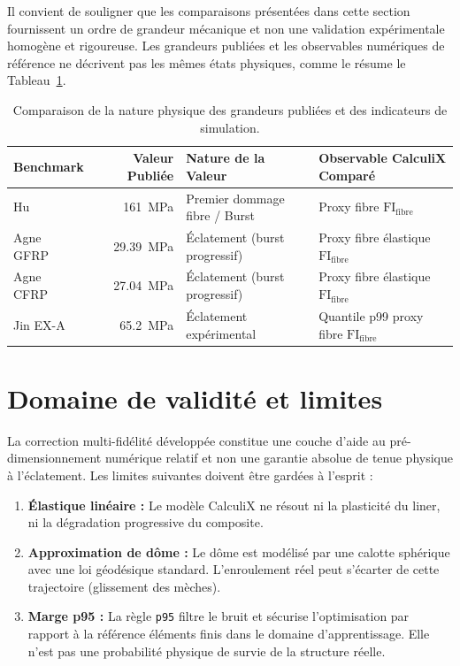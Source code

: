 \documentclass[10pt,twocolumn]{article}
\newcommand{\FI}{\mathrm{FI}}
\begin{document}
Il convient de souligner que les comparaisons présentées dans cette section fournissent un ordre de grandeur mécanique et non une validation expérimentale homogène et rigoureuse. Les grandeurs publiées et les observables numériques de référence ne décrivent pas les mêmes états physiques, comme le résume le Tableau~\ref{tab:comparison-nature}.

\begin{table}[t]
\centering
\caption{Comparaison de la nature physique des grandeurs publiées et des indicateurs de simulation.}
\label{tab:comparison-nature}
\footnotesize
\begin{tabular}{lrll}
\toprule
\textbf{Benchmark} & \textbf{Valeur Publiée} & \textbf{Nature de la Valeur} & \textbf{Observable CalculiX Comparé} \\
\midrule
Hu~\citep{Hu2021} & \SI{161}{MPa} & Premier dommage fibre / Burst & Proxy fibre $\FI_{\mathrm{fibre}}$ \\
Agne GFRP~\citep{Agne2025} & \SI{29.39}{MPa} & Éclatement (burst progressif) & Proxy fibre élastique $\FI_{\mathrm{fibre}}$ \\
Agne CFRP~\citep{Agne2025} & \SI{27.04}{MPa} & Éclatement (burst progressif) & Proxy fibre élastique $\FI_{\mathrm{fibre}}$ \\
Jin EX-A~\citep{JinPaik2022} & \SI{65.2}{MPa} & Éclatement expérimental & Quantile p99 proxy fibre $\FI_{\mathrm{fibre}}$ \\
\bottomrule
\end{tabular}
\end{table}

\section{Domaine de validité et limites}

La correction multi-fidélité développée constitue une couche d'aide au pré-dimensionnement numérique relatif et non une garantie absolue de tenue physique à l'éclatement. Les limites suivantes doivent être gardées à l'esprit :
\begin{enumerate}
    \item \textbf{Élastique linéaire :} Le modèle CalculiX ne résout ni la plasticité du liner, ni la dégradation progressive du composite.
    \item \textbf{Approximation de dôme :} Le dôme est modélisé par une calotte sphérique avec une loi géodésique standard. L'enroulement réel peut s'écarter de cette trajectoire (glissement des mèches).
    \item \textbf{Marge p95 :} La règle \texttt{p95} filtre le bruit et sécurise l'optimisation par rapport à la référence éléments finis dans le domaine d'apprentissage. Elle n'est pas une probabilité physique de survie de la structure réelle.
\end{enumerate}
\end{document}
